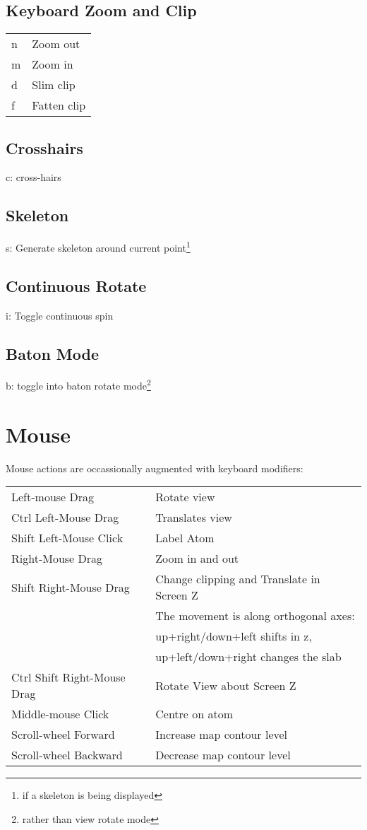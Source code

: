 \documentclass[twocolumn]{article}
\begin{document}
\subsection{Keyboard Zoom and Clip}

\begin{tabular}{ll}

  n & Zoom out   \\
  m & Zoom in    \\
  d & Slim clip  \\
  f & Fatten clip\\
\end{tabular}

\subsection{Crosshairs}
c: cross-hairs

\subsection{Skeleton}
s: Generate skeleton around current point\footnote{if a skeleton is being
displayed}

\subsection{Continuous Rotate}
i: Toggle continuous spin

\subsection{Baton Mode}
b: toggle into baton rotate mode\footnote{rather than view rotate
  mode}

\newpage
\section{Mouse}
Mouse actions are occassionally augmented with keyboard modifiers:
  \vspace{5mm}

  \begin{tabular}{ll}
    Left-mouse Drag & Rotate view \\
    Ctrl Left-Mouse Drag &  Translates view \\
    Shift Left-Mouse Click &  Label Atom\\
    Right-Mouse Drag &  Zoom in and out\index{zoom}\\
    Shift Right-Mouse Drag & Change clipping and Translate in Screen Z \\
    & The movement is along orthogonal axes: \\
    & up+right/down+left shifts in z, \\ 
    &  up+left/down+right changes the slab \\
    Ctrl Shift Right-Mouse Drag &  Rotate View about Screen Z\\
    Middle-mouse Click & Centre on atom\\
    Scroll-wheel Forward &  Increase map contour level\\
    Scroll-wheel Backward &  Decrease map contour level
  \end{tabular}
\end{document}
